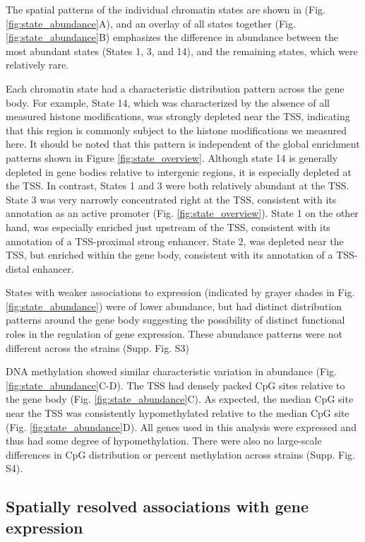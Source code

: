 \documentclass[
  11pt,
]{article}
\begin{document}
The spatial patterns of the individual chromatin states are shown in
(Fig. \ref{fig:state_abundance}A), and an overlay of all states together
(Fig. \ref{fig:state_abundance}B) emphasizes the difference in abundance
between the most abundant states (States 1, 3, and 14), and the
remaining states, which were relatively rare.

Each chromatin state had a characteristic distribution pattern across
the gene body. For example, State 14, which was characterized by the
absence of all measured histone modifications, was strongly depleted
near the TSS, indicating that this region is commonly subject to the
histone modifications we measured here. It should be noted that this
pattern is independent of the global enrichment patterns shown in Figure
\ref{fig:state_overview}. Although state 14 is generally depleted in
gene bodies relative to intergenic regions, it is especially depleted at
the TSS. In contrast, States 1 and 3 were both relatively abundant at
the TSS. State 3 was very narrowly concentrated right at the TSS,
consistent with its annotation as an active promoter (Fig.
\ref{fig:state_overview}). State 1 on the other hand, was especially
enriched just upstream of the TSS, consistent with its annotation of a
TSS-proximal strong enhancer. State 2, was depleted near the TSS, but
enriched within the gene body, consistent with its annotation of a
TSS-distal enhancer.

States with weaker associations to expression (indicated by grayer
shades in Fig. \ref{fig:state_abundance}) were of lower abundance, but
had distinct distribution patterns around the gene body suggesting the
possibility of distinct functional roles in the regulation of gene
expression. These abundance patterns were not different across the
strains (Supp. Fig. S3)

DNA methylation showed similar characteristic variation in abundance
(Fig. \ref{fig:state_abundance}C-D). The TSS had densely packed CpG
sites relative to the gene body (Fig. \ref{fig:state_abundance}C). As
expected, the median CpG site near the TSS was consistently
hypomethylated relative to the median CpG site (Fig.
\ref{fig:state_abundance}D). All genes used in this analysis were
expressed and thus had some degree of hypomethylation. There were also
no large-scale differences in CpG distribution or percent methylation
across strains (Supp. Fig. S4).

\hypertarget{spatially-resolved-associations-with-gene-expression}{%
\subsection{Spatially resolved associations with gene
expression}\label{spatially-resolved-associations-with-gene-expression}}
\end{document}
